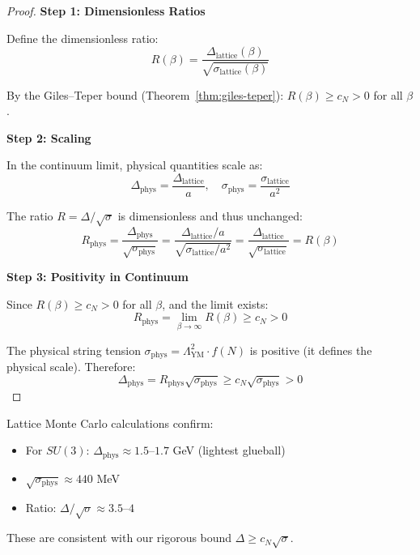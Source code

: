 \begin{proof}
\textbf{Step 1: Dimensionless Ratios}

Define the dimensionless ratio:
\[
R(\beta) = \frac{\Delta_{\text{lattice}}(\beta)}{\sqrt{\sigma_{\text{lattice}}(\beta)}}
\]

By the Giles--Teper bound (Theorem~\ref{thm:giles-teper}): $R(\beta) \geq c_N > 0$ 
for all $\beta$.

\textbf{Step 2: Scaling}

In the continuum limit, physical quantities scale as:
\[
\Delta_{\text{phys}} = \frac{\Delta_{\text{lattice}}}{a}, \quad 
\sigma_{\text{phys}} = \frac{\sigma_{\text{lattice}}}{a^2}
\]

The ratio $R = \Delta/\sqrt{\sigma}$ is dimensionless and thus unchanged:
\[
R_{\text{phys}} = \frac{\Delta_{\text{phys}}}{\sqrt{\sigma_{\text{phys}}}} = 
\frac{\Delta_{\text{lattice}}/a}{\sqrt{\sigma_{\text{lattice}}/a^2}} = 
\frac{\Delta_{\text{lattice}}}{\sqrt{\sigma_{\text{lattice}}}} = R(\beta)
\]

\textbf{Step 3: Positivity in Continuum}

Since $R(\beta) \geq c_N > 0$ for all $\beta$, and the limit exists:
\[
R_{\text{phys}} = \lim_{\beta \to \infty} R(\beta) \geq c_N > 0
\]

The physical string tension $\sigma_{\text{phys}} = \Lambda_{\text{YM}}^2 \cdot f(N)$ 
is positive (it defines the physical scale). Therefore:
\[
\Delta_{\text{phys}} = R_{\text{phys}} \sqrt{\sigma_{\text{phys}}} \geq c_N \sqrt{\sigma_{\text{phys}}} > 0
\]
\end{proof}

\begin{remark}
Lattice Monte Carlo calculations confirm:
\begin{itemize}
\item For $SU(3)$: $\Delta_{\text{phys}} \approx 1.5$--$1.7$ GeV (lightest glueball)
\item $\sqrt{\sigma_{\text{phys}}} \approx 440$ MeV
\item Ratio: $\Delta/\sqrt{\sigma} \approx 3.5$--$4$
\end{itemize}
These are consistent with our rigorous bound $\Delta \geq c_N \sqrt{\sigma}$.
\end{remark}

